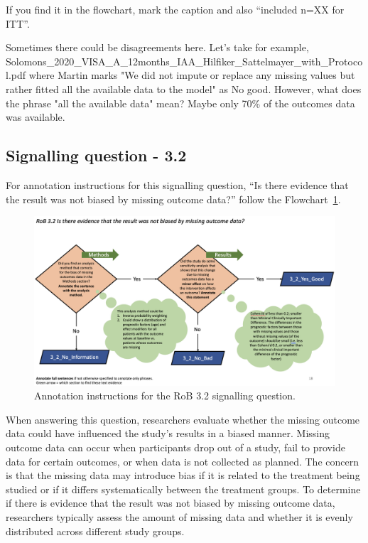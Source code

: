 \documentclass[sn-mathphys,Numbered]{sn-jnl}%
\begin{document}
If you find it in the flowchart, mark the caption and also ``included n=XX for ITT''. %

Sometimes there could be disagreements here. Let's take for example, Solomons\_2020\_VISA\_A\_12months\_IAA\_Hilfiker\_Sattelmayer\_with\_Protocol.pdf where Martin marks "We did not impute or replace any missing values but rather fitted all the available data to the model" as No good. 
However, what does the phrase "all the available data" mean? Maybe only 70\% of the outcomes data was available.
%
%
%
\subsection*{Signalling question - 3.2 }
%
For annotation instructions for this signalling question, ``Is there evidence that the result was not biased by missing outcome data?'' follow the Flowchart~\ref{fig:3_2}.
%
\begin{figure}[hbt]
    \centering
    \includegraphics[width=\textwidth]{figures/3_2.png}
    \caption{Annotation instructions for the RoB 3.2 signalling question.}
    \label{fig:3_2}
\end{figure}
%
When answering this question, researchers evaluate whether the missing outcome data could have influenced the study's results in a biased manner.
Missing outcome data can occur when participants drop out of a study, fail to provide data for certain outcomes, or when data is not collected as planned.
The concern is that the missing data may introduce bias if it is related to the treatment being studied or if it differs systematically between the treatment groups.
To determine if there is evidence that the result was not biased by missing outcome data, researchers typically assess the amount of missing data and whether it is evenly distributed across different study groups.
\end{document}
